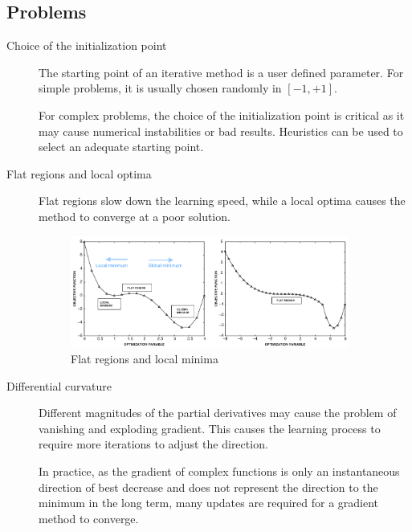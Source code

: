 \subsection{Problems}

\begin{description}
    \item[Choice of the initialization point] 
        The starting point of an iterative method is a user defined parameter.
        For simple problems, it is usually chosen randomly in $[-1, +1]$.
        
        For complex problems, the choice of the initialization point is critical as 
        it may cause numerical instabilities or bad results.
        Heuristics can be used to select an adequate starting point.

    \item[Flat regions and local optima] 
        Flat regions slow down the learning speed,
        while a local optima causes the method to converge at a poor solution.
        \begin{figure}[ht]
            \centering
            \includegraphics[width=0.9\textwidth]{img/_descent_local_flat.pdf}
            \caption{Flat regions and local minima}
        \end{figure}
    
    \item[Differential curvature]
        Different magnitudes of the partial derivatives may cause the problem of
        vanishing and exploding gradient. 
        This causes the learning process to require more iterations to adjust the direction.

        In practice, as the gradient of complex functions is only an instantaneous direction of best decrease and
        does not represent the direction to the minimum in the long term, 
        many updates are required for a gradient method to converge.


\end{description}
